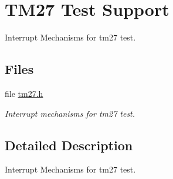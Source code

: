 \hypertarget{group__zynq__tm27}{}\section{T\+M27 Test Support}
\label{group__zynq__tm27}


Interrupt Mechanisms for tm27 test.  


\subsection*{Files}
\begin{DoxyCompactItemize}
\item 
file \mbox{\hyperlink{arm_2xilinx-zynq_2include_2tm27_8h}{tm27.\+h}}
\begin{DoxyCompactList}\small\item\em Interrupt mechanisms for tm27 test. \end{DoxyCompactList}\end{DoxyCompactItemize}


\subsection{Detailed Description}
Interrupt Mechanisms for tm27 test. 

